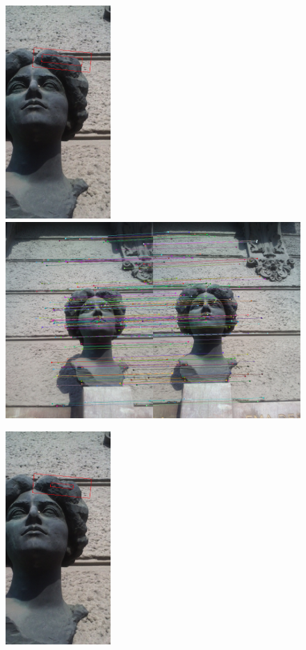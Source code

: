 \begin{figure}[H]
\centerline{
\includegraphics[width=4.0cm]{img/rectangle_w_02_h_035_croped.png}
\includegraphics[width=12.1cm]{img/matching_w_02_h_035.png}}
\centerline{
\includegraphics[width=4.0cm]{img/rectangle_w_01__h_02_croped.png}
}
\end{figure}
